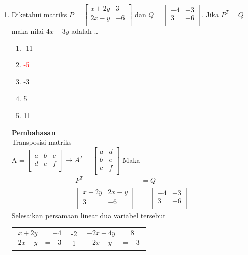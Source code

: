 \documentclass{report}
\newcommand{\options}[5]{
\begin{enumerate}[label=\alph*.]
	\item #1
	\item #2
	\item #3
	\item #4
	\item #5
\end{enumerate}
}
\newcommand{\pemb}{ \textbf{Pembahasan} \\}
\begin{document}
\begin{enumerate}
\item Diketahui matriks $ P=
	\begin{bmatrix}
		x+2y & 3 \\
		2x-y & -6 \\
	\end{bmatrix}
	$  dan $Q=
	\begin{bmatrix}
		-4 & -3 \\
		3 & -6 \\
	\end{bmatrix}
	$. Jika $P^{T} = Q$ maka nilai $4x-3y$ adalah \ldots
	\options
	{-11}
	{\textcolor{red}{-5}}
	{-3}
	{5}
	{11}
	\pemb
	Transposisi matriks \\
	    A = $\begin{bmatrix}
			a & b & c\\
			d & e & f\\
		\end{bmatrix}
		\to
		A^{T} = \begin{bmatrix}
			a & d \\
			b & e \\
			c & f \\
		\end{bmatrix}$
	Maka
	\begin{align*}
		P^T 
		&= Q \\
		\begin{bmatrix}
			x+2y & 2x-y \\
			3 & -6 \\
		\end{bmatrix} &=
		\begin{bmatrix}
			-4 & -3 \\
			3 & -6 \\
		\end{bmatrix}
	\end{align*}
	Selesaikan persamaan linear dua variabel tersebut
	\begin{center}
	\begin{tabular}{c|c|c}
		\parbox{3cm}{
			\begin{align*}
			x+2y &= -4 \\
			2x-y &= -3
			\end{align*}
		} & \parbox{0.3cm}{
			-2 \\ 1 
		} &
		\parbox{3cm}{
			\begin{align*}
			-2x-4y&=8\\
			-2x-y&=-3
			\end{align*}
		} \\
	\end{tabular} 

\end{center}
\end{enumerate}
\end{document}
